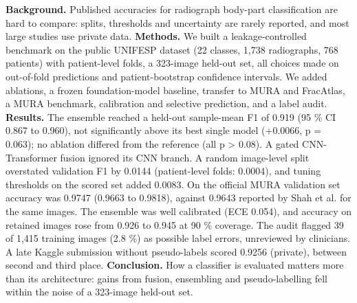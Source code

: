 \textbf{Background.} Published accuracies for radiograph body-part classification are hard to compare: splits, thresholds and uncertainty are rarely reported, and most large studies use private data.
\textbf{Methods.} We built a leakage-controlled benchmark on the public UNIFESP dataset (22 classes, 1,738 radiographs, 768 patients) with patient-level folds, a 323-image held-out set, all choices made on out-of-fold predictions and patient-bootstrap confidence intervals. We added ablations, a frozen foundation-model baseline, transfer to MURA and FracAtlas, a MURA benchmark, calibration and selective prediction, and a label audit.
\textbf{Results.} The ensemble reached a held-out sample-mean F1 of 0.919 (95 \% CI 0.867 to 0.960), not significantly above its best single model (+0.0066, p = 0.063); no ablation differed from the reference (all p > 0.08). A gated CNN-Transformer fusion ignored its CNN branch. A random image-level split overstated validation F1 by 0.0144 (patient-level folds: 0.0004), and tuning thresholds on the scored set added 0.0083. On the official MURA validation set accuracy was 0.9747 (0.9663 to 0.9818), against 0.9643 reported by Shah et al. for the same images. The ensemble was well calibrated (ECE 0.054), and accuracy on retained images rose from 0.926 to 0.945 at 90 \% coverage. The audit flagged 39 of 1,415 training images (2.8 \%) as possible label errors, unreviewed by clinicians. A late Kaggle submission without pseudo-labels scored 0.9256 (private), between second and third place.
\textbf{Conclusion.} How a classifier is evaluated matters more than its architecture: gains from fusion, ensembling and pseudo-labelling fell within the noise of a 323-image held-out set.


